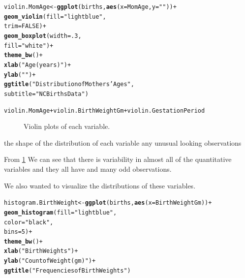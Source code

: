 \documentclass{article}\usepackage[]{graphicx}\usepackage[]{xcolor}
\makeatletter
\newcommand{\hlnum}[1]{\textcolor[rgb]{0.686,0.059,0.569}{#1}}%
\newcommand{\hlstr}[1]{\textcolor[rgb]{0.192,0.494,0.8}{#1}}%
\newcommand{\hlopt}[1]{\textcolor[rgb]{0,0,0}{#1}}%
\newcommand{\hlstd}[1]{\textcolor[rgb]{0.345,0.345,0.345}{#1}}%
\newcommand{\hlkwb}[1]{\textcolor[rgb]{0.69,0.353,0.396}{#1}}%
\newcommand{\hlkwc}[1]{\textcolor[rgb]{0.333,0.667,0.333}{#1}}%
\newcommand{\hlkwd}[1]{\textcolor[rgb]{0.737,0.353,0.396}{\textbf{#1}}}%
\newenvironment{kframe}{%
 \def\at@end@of@kframe{}%
 \ifinner\ifhmode%
  \def\at@end@of@kframe{\end{minipage}}%
  \begin{minipage}{\columnwidth}%
 \fi\fi%
 \def\FrameCommand##1{\hskip\@totalleftmargin \hskip-\fboxsep
 \colorbox{shadecolor}{##1}\hskip-\fboxsep
     \hskip-\linewidth \hskip-\@totalleftmargin \hskip\columnwidth}%
 \MakeFramed {\advance\hsize-\width
   \@totalleftmargin\z@ \linewidth\hsize
   \@setminipage}}%
 {\par\unskip\endMakeFramed%
 \at@end@of@kframe}
\newenvironment{knitrout}{}{} %
\makeatother
\begin{document}
\begin{enumerate}[a.]
\begin{knitrout}
\begin{kframe}
\begin{alltt}
\hlstd{violin.MomAge} \hlkwb{<-} \hlkwd{ggplot}\hlstd{(births,} \hlkwd{aes}\hlstd{(}\hlkwc{x}\hlstd{=MomAge,} \hlkwc{y}\hlstd{=}\hlstr{""}\hlstd{))}\hlopt{+}
  \hlkwd{geom_violin}\hlstd{(}\hlkwc{fill} \hlstd{=} \hlstr{"lightblue"}\hlstd{,}
              \hlkwc{trim} \hlstd{=} \hlnum{FALSE}\hlstd{)}\hlopt{+}
  \hlkwd{geom_boxplot}\hlstd{(}\hlkwc{width} \hlstd{=} \hlnum{.3}\hlstd{,}
               \hlkwc{fill} \hlstd{=} \hlstr{"white"}\hlstd{)} \hlopt{+}
  \hlkwd{theme_bw}\hlstd{()}\hlopt{+}
  \hlkwd{xlab}\hlstd{(}\hlstr{"Age (years)"}\hlstd{)}\hlopt{+}
  \hlkwd{ylab}\hlstd{(}\hlstr{" "}\hlstd{)}\hlopt{+}
  \hlkwd{ggtitle}\hlstd{(}\hlstr{"Distribution of Mothers' Ages"}\hlstd{,}
          \hlkwc{subtitle} \hlstd{=} \hlstr{"NCBirths Data"}\hlstd{)}

\hlstd{violin.MomAge} \hlopt{+} \hlstd{violin.BirthWeightGm} \hlopt{+} \hlstd{violin.GestationPeriod}
\end{alltt}
\end{kframe}
\end{knitrout}

\begin{figure}[H]
\centering

\caption{Violin plots of each variable.}
\label{ViolinSummary}
\end{figure}

the shape of the distribution of each variable
any unusual looking observations

From \ref{ViolinSummary} We can see that there is variability in almost all of the quantitative variables and they all have and many odd observations.

We also wanted to visualize the distributions of these variables.

\begin{knitrout}
\color{fgcolor}\begin{kframe}
\begin{alltt}
\hlstd{histogram.BirthWeight}\hlkwb{<-} \hlkwd{ggplot}\hlstd{(births,} \hlkwd{aes}\hlstd{(}\hlkwc{x}\hlstd{=BirthWeightGm))}\hlopt{+}
  \hlkwd{geom_histogram}\hlstd{(}\hlkwc{fill} \hlstd{=} \hlstr{"lightblue"}\hlstd{,}
                 \hlkwc{color} \hlstd{=} \hlstr{"black"}\hlstd{,}
                 \hlkwc{bins} \hlstd{=} \hlnum{5}\hlstd{)} \hlopt{+}
  \hlkwd{theme_bw}\hlstd{()} \hlopt{+}
  \hlkwd{xlab}\hlstd{(}\hlstr{"Birth Weights"}\hlstd{)}\hlopt{+}
  \hlkwd{ylab}\hlstd{(}\hlstr{"Count of Weight(gm)"}\hlstd{)}\hlopt{+}
  \hlkwd{ggtitle}\hlstd{(}\hlstr{"Frequencies of Birth Weights"}\hlstd{)}



\end{alltt}
\end{kframe}
\end{knitrout}
\end{enumerate}
\end{document}
